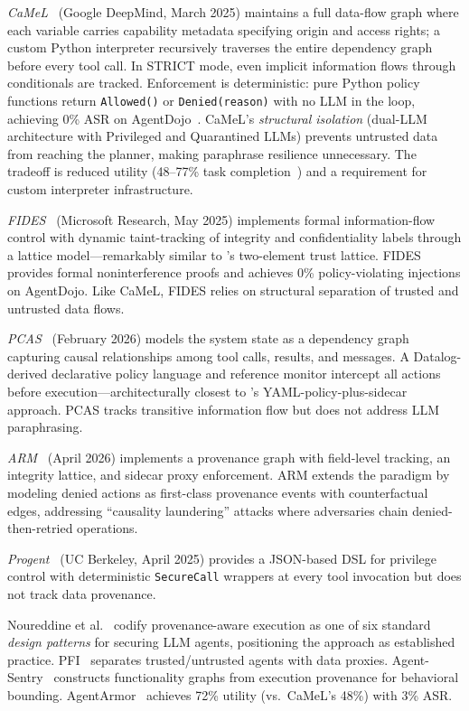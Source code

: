 \emph{CaMeL}~\cite{camel2025} (Google DeepMind, March 2025) maintains a full data-flow graph where each variable carries capability metadata specifying origin and access rights; a custom Python interpreter recursively traverses the entire dependency graph before every tool call. In STRICT mode, even implicit information flows through conditionals are tracked. Enforcement is deterministic: pure Python policy functions return \texttt{Allowed()} or \texttt{Denied(reason)} with no LLM in the loop, achieving 0\% ASR on AgentDojo~\cite{agentdojo2024}. CaMeL's \emph{structural isolation} (dual-LLM architecture with Privileged and Quarantined LLMs) prevents untrusted data from reaching the planner, making paraphrase resilience unnecessary. The tradeoff is reduced utility (48--77\% task completion~\cite{opcamel2025,agentarmor2025}) and a requirement for custom interpreter infrastructure.

\emph{FIDES}~\cite{fides2025} (Microsoft Research, May 2025) implements formal information-flow control with dynamic taint-tracking of integrity and confidentiality labels through a lattice model---remarkably similar to \sys{}'s two-element trust lattice. FIDES provides formal noninterference proofs and achieves 0\% policy-violating injections on AgentDojo. Like CaMeL, FIDES relies on structural separation of trusted and untrusted data flows.

\emph{PCAS}~\cite{pcas2026} (February 2026) models the system state as a dependency graph capturing causal relationships among tool calls, results, and messages. A Datalog-derived declarative policy language and reference monitor intercept all actions before execution---architecturally closest to \sys{}'s YAML-policy-plus-sidecar approach. PCAS tracks transitive information flow but does not address LLM paraphrasing.

\emph{ARM}~\cite{arm2026} (April 2026) implements a provenance graph with field-level tracking, an integrity lattice, and sidecar proxy enforcement. ARM extends the paradigm by modeling denied actions as first-class provenance events with counterfactual edges, addressing ``causality laundering'' attacks where adversaries chain denied-then-retried operations.

\emph{Progent}~\cite{progent2025} (UC Berkeley, April 2025) provides a JSON-based DSL for privilege control with deterministic \texttt{SecureCall} wrappers at every tool invocation but does not track data provenance.

Noureddine et al.~\cite{designpatterns2025} codify provenance-aware execution as one of six standard \emph{design patterns} for securing LLM agents, positioning the approach as established practice. PFI~\cite{pfi2025} separates trusted/untrusted agents with data proxies. Agent-Sentry~\cite{agentsentry2026} constructs functionality graphs from execution provenance for behavioral bounding. AgentArmor~\cite{agentarmor2025} achieves 72\% utility (vs.\ CaMeL's 48\%) with 3\% ASR.

